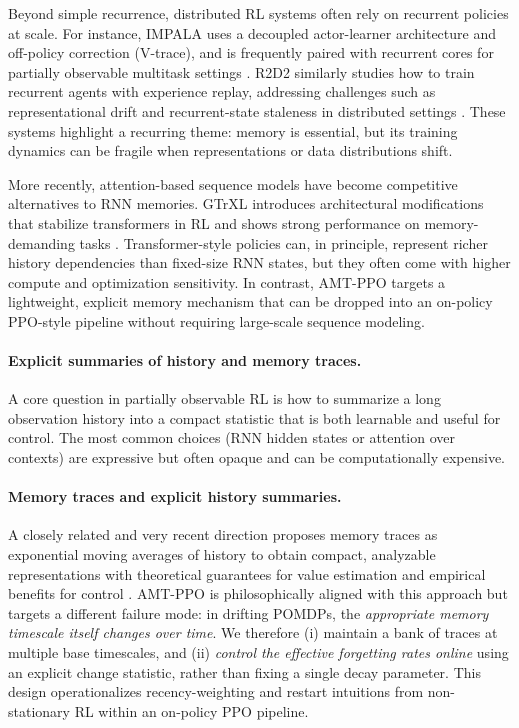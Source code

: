 \documentclass{article}
\begin{document}
Beyond simple recurrence, distributed RL systems often rely on recurrent policies at scale. For instance, IMPALA uses a decoupled actor-learner architecture and off-policy correction (V-trace), and is frequently paired with recurrent cores for partially observable multitask settings \citep{pmlr-v80-espeholt18a}. R2D2 similarly studies how to train recurrent agents with experience replay, addressing challenges such as representational drift and recurrent-state staleness in distributed settings \citep{DBLP:conf/iclr/KapturowskiOQMD19}. These systems highlight a recurring theme: memory is essential, but its training dynamics can be fragile when representations or data distributions shift.

More recently, attention-based sequence models have become competitive alternatives to RNN memories. GTrXL introduces architectural modifications that stabilize transformers in RL and shows strong performance on memory-demanding tasks \citep{pmlr-v119-parisotto20a}. Transformer-style policies can, in principle, represent richer history dependencies than fixed-size RNN states, but they often come with higher compute and optimization sensitivity. In contrast, AMT-PPO targets a lightweight, explicit memory mechanism that can be dropped into an on-policy PPO-style pipeline without requiring large-scale sequence modeling.

\paragraph{Explicit summaries of history and memory traces.}
A core question in partially observable RL is how to summarize a long observation history into a compact statistic that is both learnable and useful for control. The most common choices (RNN hidden states or attention over contexts) are expressive but often opaque and can be computationally expensive.

\paragraph{Memory traces and explicit history summaries.}
A closely related and very recent direction proposes memory traces as exponential moving averages of history to obtain compact, analyzable representations with theoretical guarantees for value estimation and empirical benefits for control \citep{eberhard2025memorytraces}.
AMT-PPO is philosophically aligned with this approach but targets a different failure mode: in drifting POMDPs, the \emph{appropriate memory timescale itself changes over time}. We therefore (i) maintain a bank of traces at multiple base timescales, and (ii) \emph{control the effective forgetting rates online} using an explicit change statistic, rather than fixing a single decay parameter. This design operationalizes recency-weighting and restart intuitions from non-stationary RL within an on-policy PPO pipeline.
\end{document}
